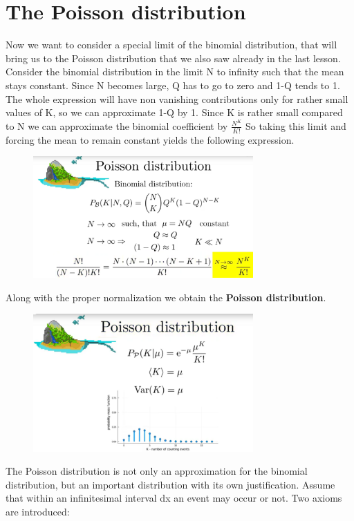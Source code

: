 \documentclass[12pt, a4paper]{scrartcl}
\begin{document}
\section*{The Poisson distribution}
Now we want to consider a special limit of the binomial distribution, that will bring us to the Poisson distribution that we also saw already in the last lesson.
Consider the binomial distribution in the limit N to infinity such that the mean stays constant. Since N becomes large, Q has to go to zero and 1-Q tends to 1.
The whole expression will have non vanishing contributions only for rather small values of K, so we can approximate 1-Q by 1.
Since K is rather small compared to N we can approximate the binomial coefficient by $\frac{N^K}{K!}$
So taking this limit and forcing the mean to remain constant yields the following expression.
 \begin{figure}[H]
	\centering
	\includegraphics[width=0.75\textwidth]{4_9.png}
\end{figure}
Along with the proper normalization we obtain the \textbf{Poisson distribution}.
 \begin{figure}[H]
	\centering
	\includegraphics[width=0.75\textwidth]{4_10.png}
\end{figure}
The Poisson distribution is not only an approximation for the binomial distribution, but an important distribution with its own justification.
Assume that within an infinitesimal interval dx an event may occur or not. 
Two axioms are introduced:\\
\end{document}

